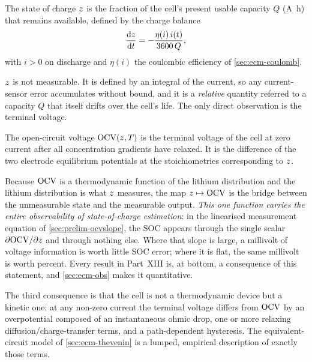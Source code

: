 \begin{definition}\label{def:ecm-soc}
The state of charge $z$ is the fraction of the cell's present usable capacity $Q$
(\si{\ampere\hour}) that remains available, defined by the charge balance
\begin{equation}
\frac{\mathrm{d}z}{\mathrm{d}t} = -\frac{\eta(i)\,i(t)}{3600\,Q},
\label{eq:ecm-socdef}
\end{equation}
with $i>0$ on discharge and $\eta(i)$ the coulombic efficiency of \cref{sec:ecm-coulomb}.
\end{definition}

$z$ is not measurable. It is defined by an integral of the current, so any current-sensor
error accumulates without bound, and it is a \emph{relative} quantity referred to a capacity $Q$
that itself drifts over the cell's life. The only direct observation is the terminal voltage.

\begin{definition}\label{def:ecm-ocv}
The open-circuit voltage $\mathrm{OCV}(z,T)$ is the terminal voltage of the cell at zero current after
all concentration gradients have relaxed. It is the difference of the two electrode equilibrium
potentials at the stoichiometries corresponding to $z$.
\end{definition}

Because $\mathrm{OCV}$ is a thermodynamic function of the lithium distribution and the lithium
distribution is what $z$ measures, the map $z\mapsto\mathrm{OCV}$ is the bridge between the
unmeasurable state and the measurable output. \emph{This one function carries the entire
observability of state-of-charge estimation}: in the linearised measurement equation of
\cref{sec:prelim-ocvslope}, the SOC appears through the single scalar
$\partial\mathrm{OCV}/\partial z$ and through nothing else. Where that slope is large, a millivolt of
voltage information is worth little SOC error; where it is flat, the same millivolt is worth
percent. Every result in Part~XIII is, at bottom, a consequence of this statement, and
\cref{sec:ecm-obs} makes it quantitative.

The third consequence is that the cell is not a thermodynamic device but a kinetic one: at any
non-zero current the terminal voltage differs from $\mathrm{OCV}$ by an overpotential composed of an
instantaneous ohmic drop, one or more relaxing diffusion/charge-transfer terms, and a
path-dependent hysteresis. The equivalent-circuit model of \cref{sec:ecm-thevenin} is a
lumped, empirical description of exactly those terms.

